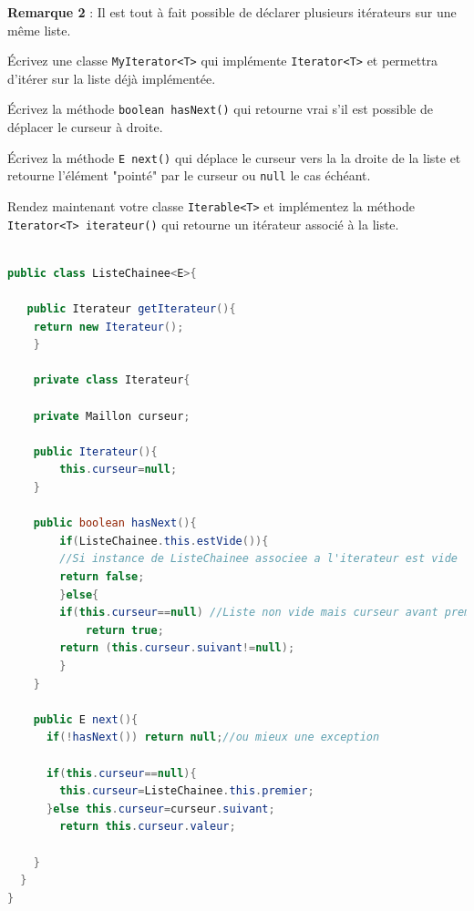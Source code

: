\documentclass[iutinfo,a4paper,nocorrections,10pt]{ustl-tdtp}
\begin{document}
\textbf{Remarque 2} : Il est tout à fait possible de déclarer plusieurs itérateurs sur une même liste.\newline

\question Écrivez une classe \texttt{MyIterator<T>} qui implémente \texttt{Iterator<T>} et permettra d'itérer sur la liste déjà implémentée.

\question Écrivez la méthode \texttt{boolean hasNext()} qui retourne vrai s'il est possible de déplacer le curseur à droite.\newline

\question Écrivez la méthode \texttt{E next()} qui déplace le curseur vers la la droite de la liste et retourne l'élément "pointé" par le curseur ou \texttt{null} le cas échéant.\newline

\question Rendez maintenant votre classe \texttt{Iterable<T>} et implémentez la méthode \texttt{Iterator<T> iterateur()} qui retourne un itérateur associé à la liste.\newline




\begin{correction}
{\color{red}
\begin{lstlisting}[language=Java]

public class ListeChainee<E>{

   public Iterateur getIterateur(){
	return new Iterateur();
    }

    private class Iterateur{
   	
   	private Maillon curseur;
   	
   	public Iterateur(){
	    this.curseur=null;
   	}
   	
   	public boolean hasNext(){
	    if(ListeChainee.this.estVide()){ 
		//Si instance de ListeChainee associee a l'iterateur est vide
		return false;	    	  
	    }else{
		if(this.curseur==null) //Liste non vide mais curseur avant premier maillon
		    return true; 	
		return (this.curseur.suivant!=null);
        }
    }   
	
    public E next(){
      if(!hasNext()) return null;//ou mieux une exception
      
      if(this.curseur==null){
        this.curseur=ListeChainee.this.premier;
      }else this.curseur=curseur.suivant;
        return this.curseur.valeur;
       
    }
  }
}


\end{lstlisting}
}

\end{correction}
\end{document}
